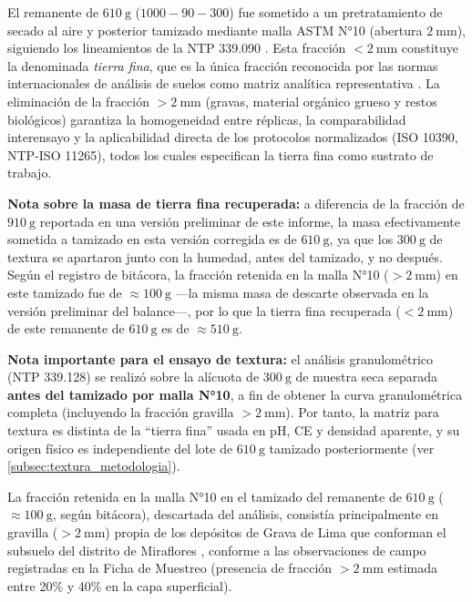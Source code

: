 \documentclass[fleqn]{jaes}
\begin{document}
El remanente de $610~\text{g}$ ($1000-90-300$) fue sometido a un pretratamiento de secado al aire y posterior tamizado mediante malla ASTM N°10 (abertura $2~\text{mm}$), siguiendo los lineamientos de la NTP 339.090 \cite{INACAL2021}. Esta fracción $<2~\text{mm}$ constituye la denominada \textit{tierra fina}, que es la única fracción reconocida por las normas internacionales de análisis de suelos como matriz analítica representativa \cite{InstitutoNacionaldeInnovacinAgrariaINIA2021}. La eliminación de la fracción $>2~\text{mm}$ (gravas, material orgánico grueso y restos biológicos) garantiza la homogeneidad entre réplicas, la comparabilidad interensayo y la aplicabilidad directa de los protocolos normalizados (ISO 10390, NTP-ISO 11265), todos los cuales especifican la tierra fina como sustrato de trabajo.

\textbf{Nota sobre la masa de tierra fina recuperada:} a diferencia de la fracción de $910~\text{g}$ reportada en una versión preliminar de este informe, la masa efectivamente sometida a tamizado en esta versión corregida es de $610~\text{g}$, ya que los $300~\text{g}$ de textura se apartaron junto con la humedad, antes del tamizado, y no después. Según el registro de bitácora, la fracción retenida en la malla N°10 ($>2~\text{mm}$) en este tamizado fue de $\approx 100~\text{g}$ —la misma masa de descarte observada en la versión preliminar del balance—, por lo que la tierra fina recuperada ($<2~\text{mm}$) de este remanente de $610~\text{g}$ es de $\approx 510~\text{g}$.

\textbf{Nota importante para el ensayo de textura:} el análisis granulométrico (NTP 339.128) se realizó sobre la alícuota de $300~\text{g}$ de muestra seca separada \textbf{antes del tamizado por malla N°10}, a fin de obtener la curva granulométrica completa (incluyendo la fracción gravilla $>2~\text{mm}$). Por tanto, la matriz para textura es distinta de la ``tierra fina'' usada en pH, CE y densidad aparente, y su origen físico es independiente del lote de $610~\text{g}$ tamizado posteriormente (ver \cref{subsec:textura_metodologia}).

La fracción retenida en la malla N°10 en el tamizado del remanente de $610~\text{g}$ ($\approx 100~\text{g}$, según bitácora), descartada del análisis, consistía principalmente en gravilla ($>2~\text{mm}$) propia de los depósitos de Grava de Lima que conforman el subsuelo del distrito de Miraflores \cite{MunicipalidadDistritaldeMiraflores2019}, conforme a las observaciones de campo registradas en la Ficha de Muestreo (presencia de fracción $>2~\text{mm}$ estimada entre 20\% y 40\% en la capa superficial).
\end{document}
